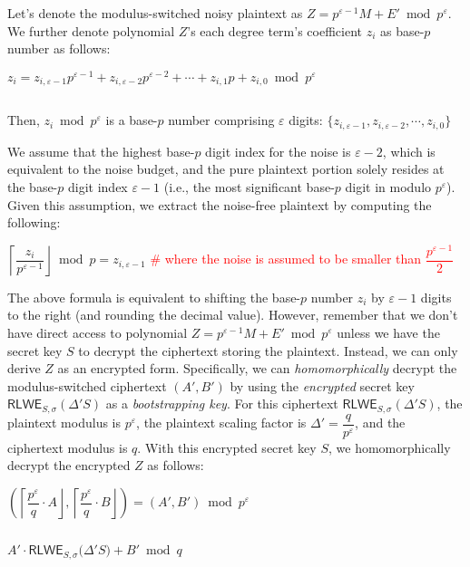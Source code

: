 Let's denote the modulus-switched noisy plaintext as $Z = p^{\varepsilon-1}M + E' \bmod p^\varepsilon$. We further denote polynomial $Z$'s each degree term's coefficient $z_i$ as base-$p$ number as follows: 

$z_i = z_{i, \varepsilon-1}p^{\varepsilon-1} + z_{i, \varepsilon-2}p^{\varepsilon-2} + \cdots + z_{i,1}p + z_{i,0} \bmod p^\varepsilon$

$ $

Then, $z_i \bmod p^\varepsilon$ is a base-$p$ number comprising $\varepsilon$ digits: $\{z_{i,\varepsilon-1}, z_{i,\varepsilon-2}, \cdots, z_{i,0}\}$


We assume that the highest base-$p$ digit index for the noise is $\varepsilon-2$, which is equivalent to the noise budget, and the pure plaintext portion solely resides at the base-$p$ digit index $\varepsilon-1$ (i.e., the most significant base-$p$ digit in modulo $p^\varepsilon$). Given this assumption, we extract the noise-free plaintext by computing the following:

$\left\lceil \dfrac{z_i}{p^{\varepsilon-1}} \right\rfloor \bmod p = z_{i,\varepsilon-1}$ \textcolor{red}{ \# where the noise is assumed to be smaller than $\dfrac{p^{\varepsilon-1}}{2}$}

The above formula is equivalent to shifting the base-$p$ number $z_i$ by $\varepsilon-1$ digits to the right (and rounding the decimal value). However, remember that we don't have direct access to polynomial $Z = p^{\varepsilon-1}M + E' \bmod p^\varepsilon$ unless we have the secret key $S$ to decrypt the ciphertext storing the plaintext. Instead, we can only derive $Z$ as an encrypted form. Specifically, we can \textit{homomorphically} decrypt the modulus-switched ciphertext $(A', B')$ by using the \textit{encrypted} secret key $\textsf{RLWE}_{S, \sigma}(\Delta' S)$ as a \textit{bootstrapping key}. For this ciphertext $\textsf{RLWE}_{S, \sigma}(\Delta' S)$, the plaintext modulus is $p^\varepsilon$, the plaintext scaling factor is $\Delta' = \dfrac{q}{p^\varepsilon}$, and the ciphertext modulus is $q$. With this encrypted secret key $S$, we homomorphically decrypt the encrypted $Z$ as follows: 


$\left(\left\lceil \dfrac{p^\varepsilon}{q}\cdot A\right\rfloor, \left\lceil \dfrac{p^\varepsilon}{q}\cdot B\right\rfloor\right) = (A', B') \bmod p^\varepsilon$ 

$ $

$A' \cdot \textsf{RLWE}_{S, \sigma}\bm(\Delta' S\bm) + B' \bmod q$


